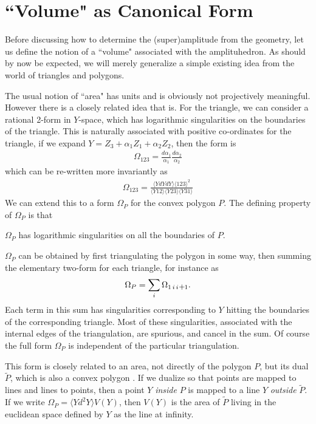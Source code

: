 \documentclass[12pt,nohyper,twosided]{JHEP3}
\newcommand{\be}{\begin{eqnarray}}
\newcommand{\ee}{\end{eqnarray}}
\newcommand{\smallplus}{\hspace{0.5pt}\text{{\small+}}\hspace{-0.5pt}}
\newcommand{\pl}{\smallplus}
\begin{document}
\section{``Volume" as Canonical Form}

Before discussing how to determine the (super)amplitude from the
geometry, let us define the notion of a ``volume" associated with
the amplituhedron. As should by now be expected, we will merely generalize a simple
existing idea from the world of triangles and polygons.

The usual notion of ``area" has units and is obviously not projectively
meaningful. However there is a closely related idea that is. For the
triangle, we can consider a rational 2-form in $Y$-space,  which has
logarithmic singularities on the boundaries of the triangle. This is
naturally associated with positive co-ordinates for the triangle, if
we expand $Y = Z_3 + \alpha_1 Z_1 + \alpha_2 Z_2$, then the form is \be
\Omega_{123} = \frac{d\alpha_1}{\alpha_1} \frac{d\alpha_2}{\alpha_2} \ee which can be
re-written more invariantly as \be \Omega_{123} = \frac{\langle Y d
Y d Y \rangle \langle 1 2 3 \rangle^2}{\langle Y 12 \rangle \langle
Y 2 3 \rangle \langle Y 3 1 \rangle} \ee We can extend this to a
form $\Omega_P$ for the convex polygon $P$. The defining property of
$\Omega_P$ is that

\begin{center}
$\Omega_P$ has logarithmic singularities on all the boundaries of
$P$.
\end{center}
$\Omega_P$ can be obtained by first triangulating the polygon in
some way, then summing the elementary two-form for each triangle,
for instance as \be \Omega_P = \sum_i \Omega_{1\,i\,i\pl1}. \ee Each
term in this sum has singularities corresponding to $Y$ hitting the
boundaries of the corresponding triangle. Most of these singularities, associated
with the internal edges of the triangulation, are spurious, and
cancel in the sum. Of course the full form $\Omega_P$ is independent
of the particular triangulation.

This form is closely related to an area, not directly of the polygon
$P$, but its dual $\tilde{P}$, which is also a convex polygon
\cite{N7}. If we dualize so that points are mapped to lines and
lines to points, then a point $Y$ {\it inside} $P$ is mapped to a
line $Y$ {\it outside} $\tilde{P}$. If we write $\Omega_P = \langle
Y d^2 Y \rangle V(Y)$, then $V(Y)$ is the area of $\tilde{P}$ living
in the euclidean space defined by $Y$ as the line at infinity.
\end{document}

